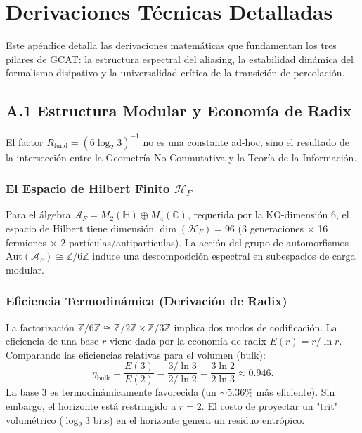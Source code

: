 \documentclass[12pt, a4paper]{article}
\theoremstyle{plain}
\theoremstyle{definition}
\begin{document}
\appendix

\section{Derivaciones Técnicas Detalladas}
\label{app:derivaciones}

Este apéndice detalla las derivaciones matemáticas que fundamentan los tres pilares de GCAT: la estructura espectral del aliasing, la estabilidad dinámica del formalismo disipativo y la universalidad crítica de la transición de percolación.

\subsection{A.1 Estructura Modular y Economía de Radix}
\label{app:spectral_trace}

El factor $R_{\text{fund}} = (6\log_2 3)^{-1}$ no es una constante ad-hoc, sino el resultado de la intersección entre la Geometría No Conmutativa y la Teoría de la Información.

\subsubsection{El Espacio de Hilbert Finito $\mathcal{H}_F$}
Para el álgebra $\mathcal{A}_F = M_2(\mathbb{H}) \oplus M_4(\mathbb{C})$, requerida por la KO-dimensión 6, el espacio de Hilbert tiene dimensión $\dim(\mathcal{H}_F) = 96$ (3 generaciones $\times$ 16 fermiones $\times$ 2 partículas/antipartículas). La acción del grupo de automorfismos $\text{Aut}(\mathcal{A}_F) \cong \mathbb{Z}/6\mathbb{Z}$ induce una descomposición espectral en subespacios de carga modular.

\subsubsection{Eficiencia Termodinámica (Derivación de Radix)}
La factorización $\mathbb{Z}/6\mathbb{Z} \cong \mathbb{Z}/2\mathbb{Z} \times \mathbb{Z}/3\mathbb{Z}$ implica dos modos de codificación. La eficiencia de una base $r$ viene dada por la economía de radix $E(r) = r/\ln r$.
Comparando las eficiencias relativas para el volumen (bulk):
\begin{equation}
\eta_{\text{bulk}} = \frac{E(3)}{E(2)} = \frac{3/\ln 3}{2/\ln 2} = \frac{3 \ln 2}{2 \ln 3} \approx 0.946.
\end{equation}
La base 3 es termodinámicamente favorecida (un $\sim 5.36\%$ más eficiente). Sin embargo, el horizonte está restringido a $r=2$. El costo de proyectar un "trit" volumétrico ($\log_2 3$ bits) en el horizonte genera un residuo entrópico.
\end{document}
